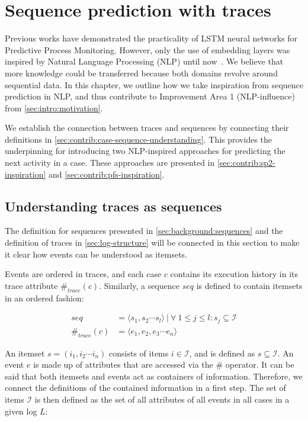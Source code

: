 \chapter{Sequence prediction with traces}
\label{chap:taking-inspiration}
Previous works have demonstrated the practicality of LSTM neural networks for Predictive Process Monitoring. However, only the use of embedding layers was inspired by Natural Language Processing (NLP) until now~\cite{evermann2016}. We believe that more knowledge could be transferred because both domains revolve around sequential data. In this chapter, we outline how we take inspiration from sequence prediction in NLP, and thus contribute to Improvement Area 1 (NLP-influence) from \autoref{sec:intro:motivation}.

We establish the connection between traces and sequences by connecting their definitions in \autoref{sec:contrib:case-sequence-understanding}. This provides the underpinning for introducing two NLP-inspired approaches for predicting the next activity in a case. These approaches are presented in \autoref{sec:contrib:sp2-inspiration} and \autoref{sec:contrib:pfs-inspiration}.

\section{Understanding traces as sequences}\label{sec:contrib:case-sequence-understanding}
The definition for sequences presented in \autoref{sec:background:sequences} and the definition of traces in \autoref{sec:log-structure} will be connected in this section to make it clear how events can be understood as itemsets.

Events are ordered in traces, and each case $c$ contains its execution history in its trace attribute $\#_{trace}(c)$.
Similarly, a sequence $seq$ is defined to contain itemsets in an ordered fashion:

\begin{equation*}
\begin{split}
seq           &=  \langle s_1,s_2\cdots s_l \rangle\ |\ \forall\ 1 \leq j \leq l: s_j \subseteq \mathscr{I}\\
\#_{trace}(c) &= \langle e_1, e_2, e_3\cdots e_n \rangle
\end{split}
\end{equation*}

An itemset $s = (i_1, i_2 \cdots i_n)$ consists of items $i \in \mathscr{I}$, and is defined as $s \subseteq \mathscr{I}$.
An event $e$ is made up of attributes that are accessed via the $\#$ operator.
It can be said that both itemsets and events act as containers of information.
Therefore, we connect the definitions of the contained information in a first step.
The set of items $\mathscr{I}$ is then defined as the set of all attributes of all events in all cases in a given log $L$:

